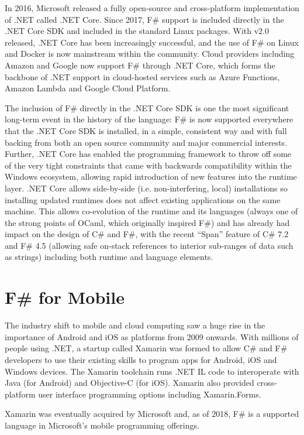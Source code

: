 \documentclass[acmsmall]{acmart}\settopmatter{}
\begin{document}
In 2016, Microsoft released a fully open-source and cross-platform implementation of .NET called .NET Core.  Since 2017, F\# support
is included directly in the .NET Core SDK and included in the standard Linux packages. With v2.0 released, .NET Core has been
increasingly successful, and the use of F\# on Linux and Docker is now mainstream within the community.  Cloud providers including
Amazon and Google now support F\# through .NET Core, which forms the backbone of .NET support in cloud-hosted services
such as Azure Functions, Amazon Lambda and Google Cloud Platform.

The inclusion of F\# directly in the .NET Core SDK is one the most significant long-term event in the history of the
language: F\# is now supported everywhere that the .NET Core SDK is installed, in a simple, consistent way and with full
backing from both an open source community and major commercial interests. Further, .NET Core has enabled the programming
framework to throw off some of the very tight constraints that came with backwards compatibility within the Windows
ecosystem, allowing rapid introduction of new features into the runtime layer. .NET Core allows side-by-side (i.e. non-interfering,
local) installations so installing updated runtimes does not affect existing applications on the same machine. This allows co-evolution
of the runtime and its languages (always one of the strong points of OCaml, which originally inspired F\#) and has already had
impact on the design of C\# and F\#, with the recent “Span” feature of C\# 7.2 and F\# 4.5 (allowing safe on-stack references
to interior sub-ranges of data such as strings) including both runtime and language elements.

\section*{F\# for Mobile}


The industry shift to mobile and cloud computing saw a huge rise in the importance of Android and iOS as platforms from 2009
onwards.  With millions of people using .NET, a startup called Xamarin was formed to allow C\# and F\# developers to use their
existing skills to program apps for Android, iOS and Windows devices.  The Xamarin toolchain runs .NET IL code to interoperate
with Java (for Android) and Objective-C (for iOS).  Xamarin also provided cross-platform user interface programming options including Xamarin.Forms. 

Xamarin was eventually acquired by Microsoft and, as of 2018, F\# is a supported language in Microsoft’s mobile programming offerings.
\end{document}
